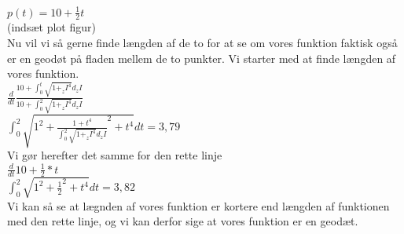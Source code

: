 \documentclass[12pt]{article}
\begin{document}
$p(t)=10+ \frac{1}{2}t $ \\
(indsæt plot figur) \\
Nu vil vi så gerne finde længden af de to for at se om vores funktion faktisk også er en geodøt på fladen mellem de to punkter. Vi starter med at finde længden af vores funktion. \\
$ \frac{d}{dt} \frac{10+\int_{0}^{t}\sqrt{1+_zI^4}d_zI}{10+\int_{0}^{2}\sqrt{1+_zI^4}d_zI}$ \\
$ \int_{0}^{2}\sqrt{1^2+ \frac{1+t^4}{\int_{0}^{2}\sqrt{1+_zI^4}d_zI}^2+t^4}dt=3,79  $\\
Vi gør herefter det samme for den rette linje \\
$ \frac{d}{dt}10+ \frac{1}{2}*t $\\
$\int_{0}^{2}\sqrt{1^2+\frac{1}{2}^2+t^4}dt=3,82 $\\
Vi kan så se at lægnden af vores funktion er kortere end længden af funktionen med den rette linje, og vi kan derfor sige at vores funktion er en geodæt.
\end{document}
